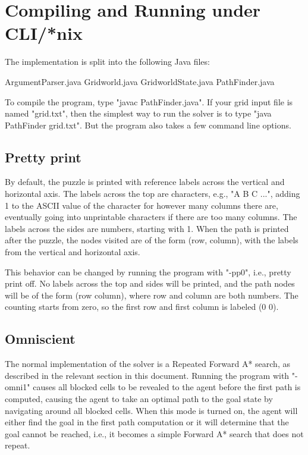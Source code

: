 \documentclass[letterpaper,11pt]{article}
\begin{document}
\section{Compiling and Running under CLI/*nix}
The implementation is split into the following Java files:
\begin{center}
ArgumentParser.java Gridworld.java GridworldState.java PathFinder.java
\end{center}
To compile the program, type "javac PathFinder.java". If your grid input file
is named "grid.txt", then the simplest way to run the solver is to type "java
PathFinder grid.txt". But the program also takes a few command line options.

\subsection{Pretty print}
By default, the puzzle is printed with reference labels across the vertical and
horizontal axis. The labels across the top are characters, e.g., "A  B  C ...",
adding 1 to the ASCII value of the character for however many columns there
are, eventually going into unprintable characters if there are too many
columns. The labels across the sides are numbers, starting with 1. When the
path is printed after the puzzle, the nodes visited are of the form (row,
column), with the labels from the vertical and horizontal axis. 

This behavior can be changed by running the program with "-pp0", i.e., pretty
print off. No labels across the top and sides will be printed, and the path
nodes will be of the form (row column), where row and column are both numbers.
The counting starts from zero, so the first row and first column is labeled (0
0).

\subsection{Omniscient}
The normal implementation of the solver is a Repeated Forward A* search, as
described in the relevant section in this document. Running the program with
"-omni1" causes all blocked cells to be revealed to the agent before the first
path is computed, causing the agent to take an optimal path to the goal state
by navigating around all blocked cells. When this mode is turned on, the agent
will either find the goal in the first path computation or it will determine
that the goal cannot be reached, i.e., it becomes a simple Forward A* search
that does not repeat.
\end{document}
